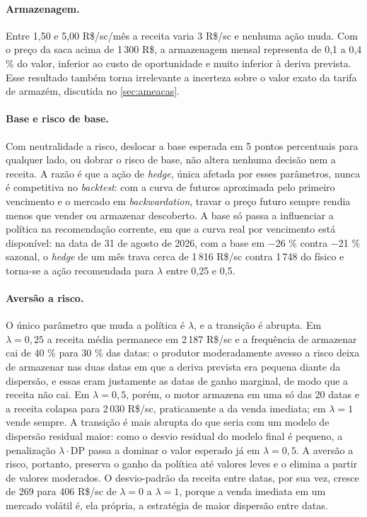 \paragraph{Armazenagem.} Entre 1,50 e 5,00 R\$/sc/mês a receita varia 3 R\$/sc e nenhuma ação muda. Com o preço da saca acima de 1\,300 R\$, a armazenagem mensal representa de 0,1 a 0,4 \% do valor, inferior ao custo de oportunidade e muito inferior à deriva prevista. Esse resultado também torna irrelevante a incerteza sobre o valor exato da tarifa de armazém, discutida no \autoref{sec:ameacas}.

\paragraph{Base e risco de base.} Com neutralidade a risco, deslocar a base esperada em 5 pontos percentuais para qualquer lado, ou dobrar o risco de base, não altera nenhuma decisão nem a receita. A razão é que a ação de \textit{hedge}, única afetada por esses parâmetros, nunca é competitiva no \textit{backtest}: com a curva de futuros aproximada pelo primeiro vencimento e o mercado em \textit{backwardation}, travar o preço futuro sempre rendia menos que vender ou armazenar descoberto. A base só passa a influenciar a política na recomendação corrente, em que a curva real por vencimento está disponível: na data de 31 de agosto de 2026, com a base em $-$26 \% contra $-$21 \% sazonal, o \textit{hedge} de um mês trava cerca de 1\,816 R\$/sc contra 1\,748 do físico e torna-se a ação recomendada para $\lambda$ entre 0,25 e 0,5.

\paragraph{Aversão a risco.} O único parâmetro que muda a política é $\lambda$, e a transição é abrupta. Em $\lambda = 0{,}25$ a receita média permanece em 2\,187 R\$/sc e a frequência de armazenar cai de 40 \% para 30 \% das datas: o produtor moderadamente avesso a risco deixa de armazenar nas duas datas em que a deriva prevista era pequena diante da dispersão, e essas eram justamente as datas de ganho marginal, de modo que a receita não cai. Em $\lambda = 0{,}5$, porém, o motor armazena em uma só das 20 datas e a receita colapsa para 2\,030 R\$/sc, praticamente a da venda imediata; em $\lambda = 1$ vende sempre. A transição é mais abrupta do que seria com um modelo de dispersão residual maior: como o desvio residual do modelo final é pequeno, a penalização $\lambda \cdot \mathrm{DP}$ passa a dominar o valor esperado já em $\lambda = 0{,}5$. A aversão a risco, portanto, preserva o ganho da política até valores leves e o elimina a partir de valores moderados. O desvio-padrão da receita entre datas, por sua vez, cresce de 269 para 406 R\$/sc de $\lambda = 0$ a $\lambda = 1$, porque a venda imediata em um mercado volátil é, ela própria, a estratégia de maior dispersão entre datas.

